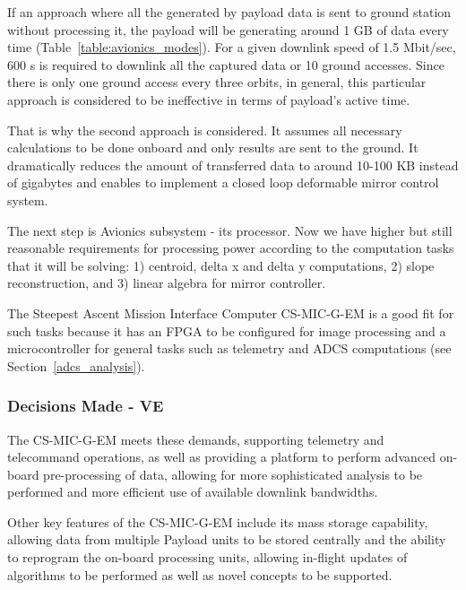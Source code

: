 \documentclass[12pt]{article}
\begin{document}
If an approach where all the generated by payload data is sent to ground station without processing it, the payload will be generating around 1 GB of data every time (Table~\ref{table:avionics_modes}). For a given downlink speed of 1.5 Mbit/sec, 600 s is required to downlink all the captured data or 10 ground accesses. Since there is only one ground access every three orbits, in general, this particular approach is considered to be ineffective in terms of payload’s active time.

That is why the second approach is considered. It assumes all necessary calculations to be done onboard and only results are sent to the ground. It dramatically reduces the amount of transferred data to around 10-100 KB instead of gigabytes and enables to implement a closed loop deformable mirror control system.

The next step is Avionics subsystem - its processor. Now we have higher but still reasonable requirements for processing power according to the computation tasks that it will be solving:
1) centroid, delta x and delta y computations, 2) slope reconstruction, and 3) linear algebra for mirror controller.

The Steepest Ascent Mission Interface Computer CS-MIC-G-EM is a good fit for such tasks because it has an FPGA to be configured for image processing and a microcontroller for general tasks such as telemetry and ADCS computations (see Section~\ref{adcs_analysis}).



\subsubsection{Decisions Made - VE}

The CS-MIC-G-EM meets these demands, supporting telemetry and telecommand operations, as well as providing a platform to perform advanced on-board pre-processing of data, allowing for more sophisticated analysis to be performed and more efficient use of available downlink bandwidths. 

Other key features of the CS-MIC-G-EM include its mass storage capability, allowing data from multiple Payload units to be stored centrally and the ability to reprogram the on-board processing units, allowing in-flight updates of algorithms to be performed as well as novel concepts to be supported.
\end{document}
